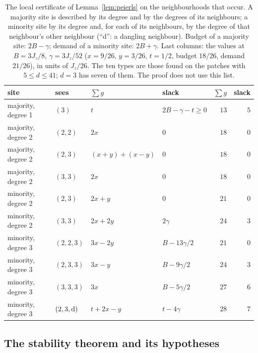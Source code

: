 \documentclass[aps,prx,onecolumn,10pt,nofootinbib,longbibliography,floatfix]{revtex4-2}
\theoremstyle{remark}
\newcommand{\Jz}{J_z}
\begin{document}
\begin{table}[h]
\caption{The local certificate of Lemma~\ref{lem:peierls} on the neighbourhoods that occur. A majority site is
described by its degree and by the degrees of its neighbours; a minority site by its degree and, for each of its
neighbours, by the degree of that neighbour's other neighbour (``d'': a dangling neighbour). Budget of a majority
site: $2B-\gamma$; demand of a minority site: $2B+\gamma$. Last columns: the values at $B=3\Jz/8$, $\gamma=3\Jz/52$ %
($x=9/26$, $y=3/26$, $t=1/2$, budget $18/26$, demand $21/26$), in units of $\Jz/26$. The ten types are those %
found on the patches with $5\le d\le41$; $d=3$ has seven of them. The proof does not use this list.} %
\label{tab:peierls}
\begin{ruledtabular}
\begin{tabular}{llllrr}
site & sees & $\sum g$ & slack & $\sum g$ & slack\\
\hline
majority, degree 1 & $(3)$ & $t$ & $2B-\gamma-t\ge0$ & $13$ & $5$\\ %
majority, degree 2 & $(2,2)$ & $2x$ & $0$ & $18$ & $0$\\ %
majority, degree 2 & $(2,3)$ & $(x+y)+(x-y)$ & $0$ & $18$ & $0$\\ %
majority, degree 2 & $(3,3)$ & $2x$ & $0$ & $18$ & $0$\\ %
minority, degree 2 & $(2,3)$ & $2x+y$ & $0$ & $21$ & $0$\\ %
minority, degree 2 & $(3,3)$ & $2x+2y$ & $2\gamma$ & $24$ & $3$\\ %
minority, degree 3 & $(2,2,3)$ & $3x-2y$ & $B-13\gamma/2$ & $21$ & $0$\\ %
minority, degree 3 & $(2,3,3)$ & $3x-y$ & $B-9\gamma/2$ & $24$ & $3$\\ %
minority, degree 3 & $(3,3,3)$ & $3x$ & $B-5\gamma/2$ & $27$ & $6$\\ %
minority, degree 3 & $(2,3,{\rm d})$ & $t+2x-y$ & $t-4\gamma$ & $28$ & $7$\\ %
\end{tabular}
\end{ruledtabular}
\end{table}

\subsection{The stability theorem and its hypotheses}
\end{document}
